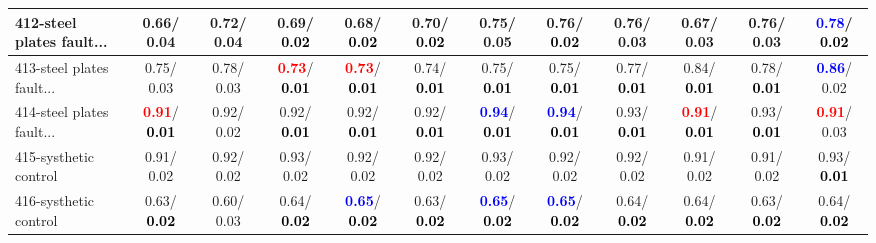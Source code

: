 \begin{table}[h]
\begin{center}
{\begin{tabular}{lc|c|c|c|c|c|c|c|c|c|c}
412-steel plates fault... &   0.66/  0.04 &   0.72/  0.04 &   0.69/\textcolor{black}{\textbf{  0.02}} &   0.68/\textcolor{black}{\textbf{  0.02}} &   0.70/\textcolor{black}{\textbf{  0.02}} &   0.75/  0.05 &   0.76/\textcolor{black}{\textbf{  0.02}} &   0.76/  0.03 &   0.67/  0.03 &   0.76/  0.03 & \textcolor{blue}{\textbf{  0.78}}/\textcolor{black}{\textbf{  0.02}} \\ \hline
413-steel plates fault... &   0.75/  0.03 &   0.78/  0.03 & \textcolor{red}{\textbf{  0.73}}/\textcolor{black}{\textbf{  0.01}} & \textcolor{red}{\textbf{  0.73}}/\textcolor{black}{\textbf{  0.01}} &   0.74/\textcolor{black}{\textbf{  0.01}} &   0.75/\textcolor{black}{\textbf{  0.01}} &   0.75/\textcolor{black}{\textbf{  0.01}} &   0.77/\textcolor{black}{\textbf{  0.01}} &   0.84/\textcolor{black}{\textbf{  0.01}} &   0.78/\textcolor{black}{\textbf{  0.01}} & \textcolor{blue}{\textbf{  0.86}}/  0.02 \\
414-steel plates fault... & \textcolor{red}{\textbf{  0.91}}/\textcolor{black}{\textbf{  0.01}} &   0.92/  0.02 &   0.92/\textcolor{black}{\textbf{  0.01}} &   0.92/\textcolor{black}{\textbf{  0.01}} &   0.92/\textcolor{black}{\textbf{  0.01}} & \textcolor{blue}{\textbf{  0.94}}/\textcolor{black}{\textbf{  0.01}} & \textcolor{blue}{\textbf{  0.94}}/\textcolor{black}{\textbf{  0.01}} &   0.93/\textcolor{black}{\textbf{  0.01}} & \textcolor{red}{\textbf{  0.91}}/\textcolor{black}{\textbf{  0.01}} &   0.93/\textcolor{black}{\textbf{  0.01}} & \textcolor{red}{\textbf{  0.91}}/  0.03 \\
415-systhetic control &   0.91/  0.02 &   0.92/  0.02 &   0.93/  0.02 &   0.92/  0.02 &   0.92/  0.02 &   0.93/  0.02 &   0.92/  0.02 &   0.92/  0.02 &   0.91/  0.02 &   0.91/  0.02 &   0.93/\textcolor{black}{\textbf{  0.01}} \\
416-systhetic control &   0.63/\textcolor{black}{\textbf{  0.02}} &   0.60/  0.03 &   0.64/\textcolor{black}{\textbf{  0.02}} & \textcolor{blue}{\textbf{  0.65}}/\textcolor{black}{\textbf{  0.02}} &   0.63/\textcolor{black}{\textbf{  0.02}} & \textcolor{blue}{\textbf{  0.65}}/\textcolor{black}{\textbf{  0.02}} & \textcolor{blue}{\textbf{  0.65}}/\textcolor{black}{\textbf{  0.02}} &   0.64/\textcolor{black}{\textbf{  0.02}} &   0.64/\textcolor{black}{\textbf{  0.02}} &   0.63/\textcolor{black}{\textbf{  0.02}} &   0.64/\textcolor{black}{\textbf{  0.02}} \\\end{tabular}}\label{stratsALCKappa12Allalla}
\end{center}
\end{table}
